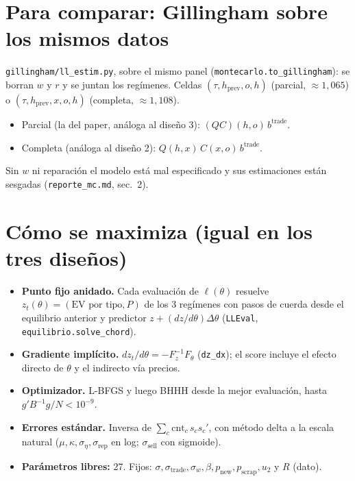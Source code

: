 \documentclass[11pt]{article}
\newcommand{\code}[1]{\texttt{\small #1}}
\newcommand{\buy}{b}
\newcommand{\1}{\mathbf{1}}
\begin{document}
\section{Para comparar: Gillingham sobre los mismos datos}\label{sec:gill}

\code{gillingham/ll\_estim.py}, sobre el mismo panel (\code{montecarlo.to\_gillingham}): se
borran $w$ y $r$ y se juntan los regímenes. Celdas $(\tau,h_{\text{prev}},o,h)$ (parcial,
$\approx 1{,}065$) o $(\tau,h_{\text{prev}},x,o,h)$ (completa, $\approx 1{,}108$).
\begin{itemize}
  \item Parcial (la del paper, análoga al diseño 3): $(QC)(h,o)\,\buy^{\text{trade}}$.
  \item Completa (análoga al diseño 2): $Q(h,x)\,C(x,o)\,\buy^{\text{trade}}$.
\end{itemize}
Sin $w$ ni reparación el modelo está mal especificado y sus estimaciones están sesgadas
(\code{reporte\_mc.md}, sec.~2).

\section{Cómo se maximiza (igual en los tres diseños)}

\begin{itemize}
  \item \textbf{Punto fijo anidado.} Cada evaluación de $\ell(\theta)$ resuelve
  $z_t(\theta)=(\text{EV por tipo},P)$ de los 3 regímenes con pasos de cuerda desde el
  equilibrio anterior y predictor $z+(dz/d\theta)\Delta\theta$ (\code{LLEval},
  \code{equilibrio.solve\_chord}).
  \item \textbf{Gradiente implícito.} $dz_t/d\theta=-F_z^{-1}F_\theta$ (\code{dz\_dx}); el
  score incluye el efecto directo de $\theta$ y el indirecto vía precios.
  \item \textbf{Optimizador.} L-BFGS y luego BHHH desde la mejor evaluación, hasta
  $g'B^{-1}g/N<10^{-9}$.
  \item \textbf{Errores estándar.} Inversa de $\sum_c\text{cnt}_c\,s_cs_c'$, con método delta
  a la escala natural ($\mu,\kappa,\sigma_\eta,\sigma_{\text{rep}}$ en log;
  $\sigma_{\text{sell}}$ con sigmoide).
  \item \textbf{Parámetros libres:} 27. Fijos: $\sigma,\sigma_{\text{trade}},\sigma_w,\beta,
  p_{\text{new}},p_{\text{scrap}},u_2$ y $R$ (dato).
\end{itemize}
\end{document}
